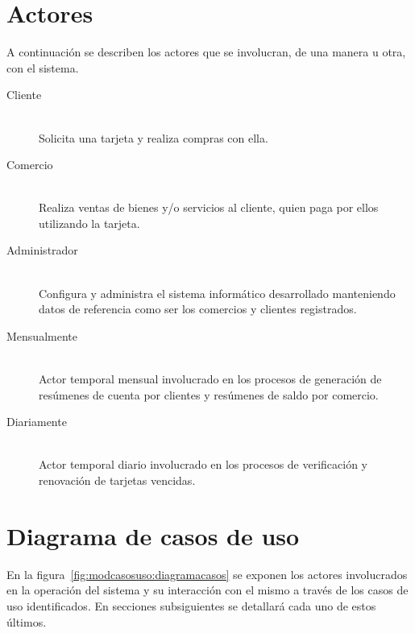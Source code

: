 \section{Actores}

A continuación se describen los actores que se involucran, de una manera u otra,
con el sistema.

\begin{description}

\item[Cliente] \hfill \\
Solicita una tarjeta y realiza compras con ella.

\item[Comercio] \hfill \\
Realiza ventas de bienes y/o servicios al cliente, quien paga por ellos
utilizando la tarjeta.

\item[Administrador] \hfill \\
Configura y administra el sistema informático desarrollado manteniendo datos de
referencia como ser los comercios y clientes registrados.

\item[Mensualmente] \hfill \\
Actor temporal mensual involucrado en los procesos de generación de resúmenes de
cuenta por clientes y resúmenes de saldo por comercio.

\item[Diariamente] \hfill \\
Actor temporal diario involucrado en los procesos de verificación y renovación
de tarjetas vencidas.

\end{description}

\section{Diagrama de casos de uso} \label{sec:diagrama_casos_uso}

En la figura~\ref{fig:modcasosuso:diagramacasos} se exponen los actores
involucrados en la operación del sistema y su interacción con el mismo a través
de los casos de uso identificados. En secciones subsiguientes se detallará cada
uno de estos últimos.

